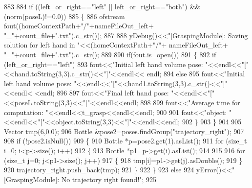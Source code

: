 \begin{DoxyCode}
883 
884     \textcolor{keywordflow}{if} ((left\_or\_right==\textcolor{stringliteral}{"left"} || left\_or\_right==\textcolor{stringliteral}{"both"}) && (norm(poseL)!=0.0))
885     \{
886         ofstream fout((homeContextPath+\textcolor{stringliteral}{"/"}+nameFileOut\_left+ \textcolor{stringliteral}{"\_"}+count\_file+\textcolor{stringliteral}{".txt"}).c\_str());
887 
888         yDebug()<<\textcolor{stringliteral}{"[GraspingModule]: Saving solution for left hand in "}<<(homeContextPath+\textcolor{stringliteral}{"/"}+
      nameFileOut\_left+ \textcolor{stringliteral}{"\_"}+count\_file+\textcolor{stringliteral}{".txt"}).c\_str();
889 
890         \textcolor{keywordflow}{if}(fout.is\_open())
891         \{
892             \textcolor{keywordflow}{if} (left\_or\_right==\textcolor{stringliteral}{"left"})
893                 fout<<\textcolor{stringliteral}{"Initial left hand volume pose: "}<<endl<<\textcolor{stringliteral}{"["}<<hand.toString(3,3).c\_str()<<\textcolor{stringliteral}{"]"}<<endl<<
      endl;
894             \textcolor{keywordflow}{else}
895                 fout<<\textcolor{stringliteral}{"Initial left hand volume pose: "}<<endl<<\textcolor{stringliteral}{"["}<<hand1.toString(3,3).c\_str()<<\textcolor{stringliteral}{"]"}<<endl<
      <endl;
896 
897             fout<<\textcolor{stringliteral}{"Final left hand pose: "}<<endl<<\textcolor{stringliteral}{"["}<<poseL.toString(3,3)<<\textcolor{stringliteral}{"]"}<<endl<<endl;
898 
899             fout<<\textcolor{stringliteral}{"Average time for computation: "}<<endl<<t\_grasp<<endl<<endl;
900 
901             fout<<\textcolor{stringliteral}{"object: "}<<endl<<\textcolor{stringliteral}{"["}<<\textcolor{keywordtype}{object}.toString(3,3)<<\textcolor{stringliteral}{"]"}<<endl<<endl;
902         \}
903     \}
904 
905     Vector tmp(6,0.0);
906     Bottle &pose2=poses.findGroup(\textcolor{stringliteral}{"trajectory\_right"});
907 
908     \textcolor{keywordflow}{if} (!pose2.isNull())
909     \{
910         Bottle *p=pose2.get(1).asList();
911         \textcolor{keywordflow}{for} (\textcolor{keywordtype}{size\_t} i=0; i<p->size(); i++)
912         \{
913             Bottle *p1=p->get(i).asList();
914 
915 
916             \textcolor{keywordflow}{for} (\textcolor{keywordtype}{size\_t} j=0; j<p1->size(); j++)
917             \{
918                 tmp[i]=p1->get(j).asDouble();
919             \}
920             trajectory\_right.push\_back(tmp);
921         \}
922     \}
923     \textcolor{keywordflow}{else}
924         yError()<<\textcolor{stringliteral}{"[GraspingModule]: No trajectory right found!"};
925 

\end{DoxyCode}
